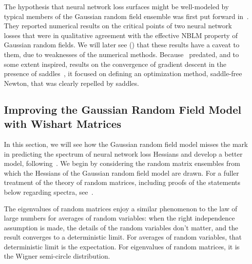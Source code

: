 \documentclass[../../thesis.tex]{subfiles}
\begin{document}
The hypothesis that neural network loss surfaces
might be well-modeled by typical members
of the Gaussian random field ensemble
was first put forward in~\cite{dauphin2014}.
They reported numerical results on the critical points
of two neural network losses that were in qualitative
agreement with the effective NBLM property
of Gaussian random fields.
We will later see ()
that these results have a caveat to them,
due to weaknesses of the numerical methods.
Because~\cite{dauphin2014} predated,
and to some extent inspired,
results on the convergence of gradient descent
in the presence of saddles~\cite{lee2016,jin2018a},
it focused on defining an optimization method,
saddle-free Newton,
that was clearly repelled by saddles.

\subsection{Improving the Gaussian Random Field Model with Wishart Matrices}

In this section, we will see
how the Gaussian random field model misses the mark
in predicting the spectrum of neural network loss Hessians
and develop a better model, following~\cite{pennington2017}.
We begin by considering the random matrix ensembles
from which the Hessians of the Gaussian random field model
are drawn.
For a fuller treatment of the theory of random matrices,
including proofs of the statements below regarding spectra,
see~\cite{tao2012}.

The eigenvalues of random matrices enjoy a similar phenomenon
to the law of large numbers for averages of random variables:
when the right independence assumption is made,
the details of the random variables don't matter,
and the result converges to a deterministic limit.
For averages of random variables,
that deterministic limit is the expectation.
For eigenvalues of random matrices,
it is the Wigner semi-circle distribution.
\end{document}
